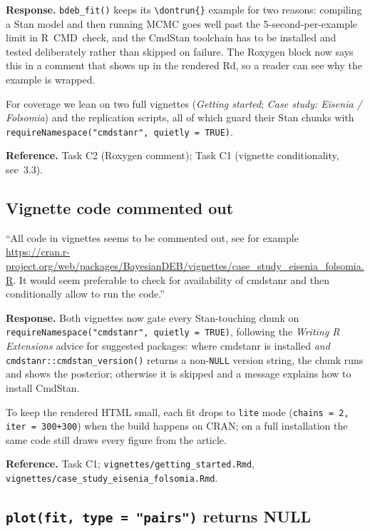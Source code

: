 \documentclass[11pt,a4paper]{article}
\newcommand{\code}[1]{\texttt{#1}}
\newcommand{\pkg}[1]{\textsf{#1}}
\begin{document}
\textbf{Response.} \code{bdeb\_fit()} keeps its
\code{\textbackslash dontrun\{\}} example for two reasons: compiling a
Stan model and then running MCMC goes well past the 5-second-per-example
limit in R~CMD~check, and the CmdStan toolchain has to be installed and
tested deliberately rather than skipped on failure. The Roxygen block now
says this in a comment that shows up in the rendered Rd, so a reader can
see why the example is wrapped.

For coverage we lean on two full vignettes (\emph{Getting started};
\emph{Case study: Eisenia / Folsomia}) and the replication scripts, all
of which guard their Stan chunks with
\verb|requireNamespace("cmdstanr", quietly = TRUE)|.

\textbf{Reference.} Task C2 (Roxygen comment); Task C1 (vignette
conditionality, see~3.3).

\subsection{Vignette code commented out}

\begin{displayquote}
``All code in vignettes seems to be commented out, see for
example
\url{https://cran.r-project.org/web/packages/BayesianDEB/vignettes/case_study_eisenia_folsomia.R}.
It would seem preferable to check for availability of \pkg{cmdstanr}
and then conditionally allow to run the code.''
\end{displayquote}

\textbf{Response.} Both vignettes now gate every Stan-touching chunk on
\verb|requireNamespace("cmdstanr", quietly = TRUE)|, following the
\emph{Writing R Extensions} advice for suggested packages: where
\pkg{cmdstanr} is installed \emph{and} \code{cmdstanr::cmdstan\_version()}
returns a non-\code{NULL} version string, the chunk runs and shows the
posterior; otherwise it is skipped and a message explains how to install
CmdStan.

To keep the rendered HTML small, each fit drops to \code{lite} mode
(\verb|chains = 2, iter = 300+300|) when the build happens on CRAN; on a
full installation the same code still draws every figure from the
article.

\textbf{Reference.} Task C1; \code{vignettes/getting\_started.Rmd},
\code{vignettes/case\_study\_eisenia\_folsomia.Rmd}.

\subsection{\code{plot(fit, type = "pairs")} returns NULL}
\end{document}
